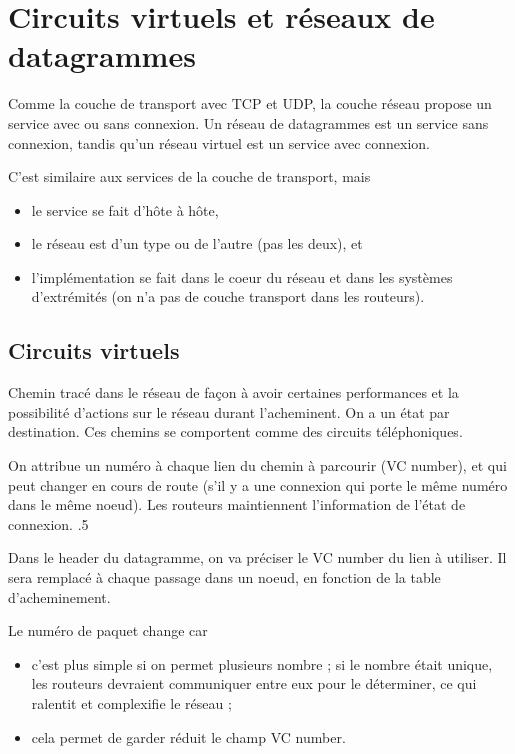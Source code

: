 
\section{Circuits virtuels et réseaux de datagrammes}

Comme la couche de transport avec TCP et UDP, la couche réseau propose un service avec ou sans connexion. Un réseau de datagrammes est un service sans connexion, tandis qu'un réseau virtuel est un service avec connexion.

C'est similaire aux services de la couche de transport, mais 
\begin{itemize}
	\item le service se fait d'hôte à hôte,
	\item le réseau est d'un type ou de l'autre (pas les deux), et 
	\item l'implémentation se fait dans le coeur du réseau et dans les systèmes d'extrémités (on n'a pas de couche transport dans les routeurs).
\end{itemize}
	\subsection{Circuits virtuels}
	
	Chemin tracé dans le réseau de façon à avoir certaines performances et la possibilité d'actions sur le réseau durant l'acheminent. On a un état par destination. Ces chemins se comportent comme des circuits téléphoniques.
	
	On attribue un numéro à chaque lien du chemin à parcourir (VC number), et qui peut changer en cours de route (s'il y a une connexion qui porte le même numéro dans le même noeud). Les routeurs maintiennent l'information de l'état de connexion.  		 		
	 {.5}	
	
	Dans le header du datagramme, on va préciser le VC number du lien à utiliser. Il sera remplacé à chaque passage dans un noeud, en fonction de la table d'acheminement.
	
	Le numéro de paquet change car
	
	\begin{itemize}
		\item c'est plus simple si on permet plusieurs nombre ; si le nombre était unique, les routeurs devraient communiquer entre eux pour le déterminer, ce qui ralentit et complexifie le réseau ;
		\item cela permet de garder réduit le champ VC number.
	\end{itemize}
				
